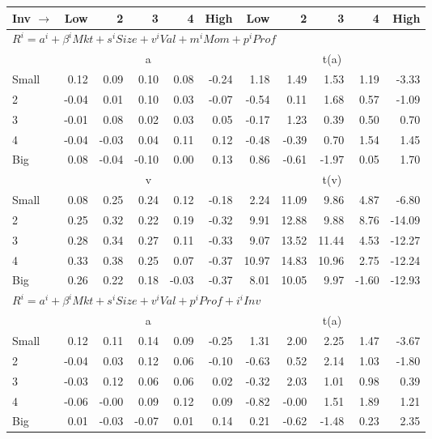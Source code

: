 
\begin{tabular}{lrrrrrrrrrr}
  \toprule
    
    Inv $\rightarrow$ & Low & 2 & 3 & 4 & High & Low & 2 & 3 & 4 & High  \\ 
  \midrule
  \multicolumn{11}{l}{$R^i=a^i+\beta^iMkt+s^iSize+v^iVal+m^iMom+p^iProf$}  \\
  
     & \multicolumn{5}{c}{a} & \multicolumn{5}{c}{t(a)}   \\
     \cmidrule(r){2-6} \cmidrule(r){7-11} 
    Small  & 0.12  & 0.09  & 0.10  & 0.08  & -0.24  & 1.18  & 1.49  & 1.53  & 1.19  & -3.33   \\
    2  & -0.04  & 0.01  & 0.10  & 0.03  & -0.07  & -0.54  & 0.11  & 1.68  & 0.57  & -1.09   \\
    3  & -0.01  & 0.08  & 0.02  & 0.03  & 0.05  & -0.17  & 1.23  & 0.39  & 0.50  & 0.70   \\
    4  & -0.04  & -0.03  & 0.04  & 0.11  & 0.12  & -0.48  & -0.39  & 0.70  & 1.54  & 1.45   \\
    Big  & 0.08  & -0.04  & -0.10  & 0.00  & 0.13  & 0.86  & -0.61  & -1.97  & 0.05  & 1.70   \\
  
     & \multicolumn{5}{c}{v} & \multicolumn{5}{c}{t(v)}   \\
     \cmidrule(r){2-6} \cmidrule(r){7-11} 
    Small  & 0.08  & 0.25  & 0.24  & 0.12  & -0.18  & 2.24  & 11.09  & 9.86  & 4.87  & -6.80   \\
    2  & 0.25  & 0.32  & 0.22  & 0.19  & -0.32  & 9.91  & 12.88  & 9.88  & 8.76  & -14.09   \\
    3  & 0.28  & 0.34  & 0.27  & 0.11  & -0.33  & 9.07  & 13.52  & 11.44  & 4.53  & -12.27   \\
    4  & 0.33  & 0.38  & 0.25  & 0.07  & -0.37  & 10.97  & 14.83  & 10.96  & 2.75  & -12.24   \\
    Big  & 0.26  & 0.22  & 0.18  & -0.03  & -0.37  & 8.01  & 10.05  & 9.97  & -1.60  & -12.93   \\

  \midrule
  \multicolumn{11}{l}{$R^i=a^i+\beta^iMkt+s^iSize+v^iVal+p^iProf+i^iInv$}  \\

     & \multicolumn{5}{c}{a} & \multicolumn{5}{c}{t(a)}   \\
     \cmidrule(r){2-6} \cmidrule(r){7-11} 
    Small  & 0.12  & 0.11  & 0.14  & 0.09  & -0.25  & 1.31  & 2.00  & 2.25  & 1.47  & -3.67   \\
    2  & -0.04  & 0.03  & 0.12  & 0.06  & -0.10  & -0.63  & 0.52  & 2.14  & 1.03  & -1.80   \\
    3  & -0.03  & 0.12  & 0.06  & 0.06  & 0.02  & -0.32  & 2.03  & 1.01  & 0.98  & 0.39   \\
    4  & -0.06  & -0.00  & 0.09  & 0.12  & 0.09  & -0.82  & -0.00  & 1.51  & 1.89  & 1.21   \\
    Big  & 0.01  & -0.03  & -0.07  & 0.01  & 0.14  & 0.21  & -0.62  & -1.48  & 0.23  & 2.35   \\

  \bottomrule
\end{tabular}
